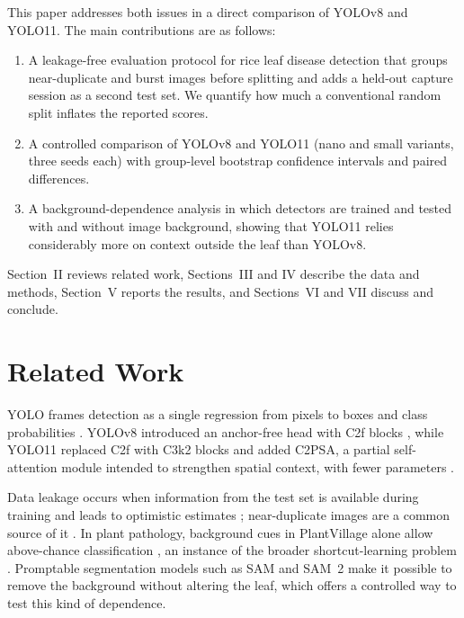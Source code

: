 \documentclass[conference,a4paper]{IEEEtran}
\begin{document}
This paper addresses both issues in a direct comparison of YOLOv8 and YOLO11. The main contributions are as follows:
\begin{enumerate}
\item A leakage-free evaluation protocol for rice leaf disease detection that groups near-duplicate and burst images before splitting and adds a held-out capture session as a second test set. We quantify how much a conventional random split inflates the reported scores.
\item A controlled comparison of YOLOv8 and YOLO11 (nano and small variants, three seeds each) with group-level bootstrap confidence intervals and paired differences.
\item A background-dependence analysis in which detectors are trained and tested with and without image background, showing that YOLO11 relies considerably more on context outside the leaf than YOLOv8.
\end{enumerate}

Section~II reviews related work, Sections~III and IV describe the data and methods, Section~V reports the results, and Sections~VI and VII discuss and conclude.

\section{Related Work}

YOLO frames detection as a single regression from pixels to boxes and class probabilities \cite{redmon2016}. YOLOv8 introduced an anchor-free head with C2f blocks \cite{ultralytics_v8}, while YOLO11 replaced C2f with C3k2 blocks and added C2PSA, a partial self-attention module intended to strengthen spatial context, with fewer parameters \cite{ultralytics_11,khanam2024,hidayatullah2025}.

Data leakage occurs when information from the test set is available during training and leads to optimistic estimates \cite{kapoor2023}; near-duplicate images are a common source of it \cite{barz2020}. In plant pathology, background cues in PlantVillage alone allow above-chance classification \cite{noyan2022}, an instance of the broader shortcut-learning problem \cite{geirhos2020,xiao2021}. Promptable segmentation models such as SAM and SAM~2 \cite{kirillov2023,ravi2024} make it possible to remove the background without altering the leaf, which offers a controlled way to test this kind of dependence.
\end{document}
